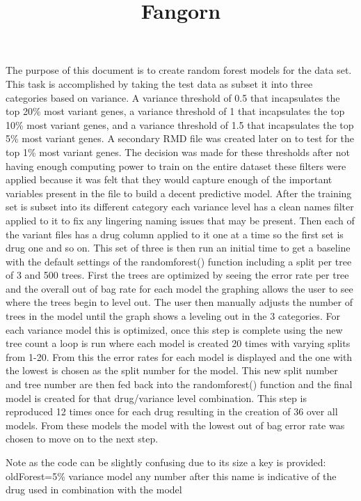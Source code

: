 \documentclass[]{article}
\title{Fangorn}
\author{}
\date{}
\begin{document}
\maketitle

The purpose of this document is to create random forest models for the
data set. This task is accomplished by taking the test data as subset it
into three categories based on variance. A variance threshold of 0.5
that incapsulates the top 20\% most variant genes, a variance threshold
of 1 that incapsulates the top 10\% most variant genes, and a variance
threshold of 1.5 that incapsulates the top 5\% most variant genes. A
secondary RMD file was created later on to test for the top 1\% most
variant genes. The decision was made for these thresholds after not
having enough computing power to train on the entire dataset these
filters were applied because it was felt that they would capture enough
of the important variables present in the file to build a decent
predictive model. After the training set is subset into its different
category each variance level has a clean names filter applied to it to
fix any lingering naming issues that may be present. Then each of the
variant files has a drug column applied to it one at a time so the first
set is drug one and so on. This set of three is then run an initial time
to get a baseline with the default settings of the randomforest()
function including a split per tree of 3 and 500 trees. First the trees
are optimized by seeing the error rate per tree and the overall out of
bag rate for each model the graphing allows the user to see where the
trees begin to level out. The user then manually adjusts the number of
trees in the model until the graph shows a leveling out in the 3
categories. For each variance model this is optimized, once this step is
complete using the new tree count a loop is run where each model is
created 20 times with varying splits from 1-20. From this the error
rates for each model is displayed and the one with the lowest is chosen
as the split number for the model. This new split number and tree number
are then fed back into the randomforest() function and the final model
is created for that drug/variance level combination. This step is
reproduced 12 times once for each drug resulting in the creation of 36
over all models. From these models the model with the lowest out of bag
error rate was chosen to move on to the next step.

Note as the code can be slightly confusing due to its size a key is
provided: oldForest=5\% variance model any number after this name is
indicative of the drug used in combination with the model
\end{document}
